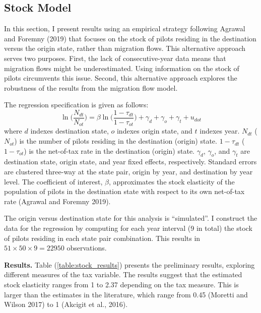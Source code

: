 \documentclass[11pt]{article}
\begin{document}
\subsection{Stock Model}

In this section, I present results using an empirical strategy following Agrawal and Foremny (2019) that focuses on the stock of pilots residing in the destination versus the origin state, rather than migration flows. This alternative approach serves two purposes. First, the lack of consecutive-year data means that migration flows might be underestimated. Using information on the stock of pilots circumvents this issue. Second, this alternative approach explores the robustness of the results from the migration flow model.

The regression specification is given as follows:
\begin{equation} \label{stock_reg}
	\ln \biggr ( \frac{N_{dt}}{N_{ot}} \biggr)= \beta \ln \biggr(\frac{1 - \tau_{dt}}{1 - \tau_{ot}} \biggr) + \gamma_d + \gamma_o + \gamma_t +  u_{dot}
\end{equation}
where $d$ indexes destination state, $o$ indexes origin state, and $t$ indexes year. $N_{dt}$ ($N_{ot}$) is the number of pilots residing in the destination (origin) state. $1 - \tau_{dt}$ ($1 - \tau_{ot}$) is the net-of-tax rate in the destination (origin) state. $ \gamma_d$, $\gamma_o$, and $\gamma_t$ are destination state, origin state, and year fixed effects, respectively. Standard errors are clustered three-way at the state pair, origin by year, and destination by year level. The coefficient of interest, $\beta$, approximates the stock elasticity of the population of pilots in the destination state with respect to its own net-of-tax rate (Agrawal and Foremny 2019).

The origin versus destination state for this analysis is ``simulated''. I construct the data for the regression by computing for each year interval (9 in total) the stock of pilots residing in each state pair combination. This results in $51 \times 50 \times 9 = 22950$ observations.

\textbf{Results.} Table (\ref{table:stock_results}) presents the preliminary results, exploring different measures of the tax variable. The results suggest that the estimated stock elasticity ranges from 1 to 2.37 depending on the tax measure. This is larger than the estimates in the literature, which range from 0.45 (Moretti and Wilson 2017) to 1 (Akcigit et al., 2016).
\end{document}
